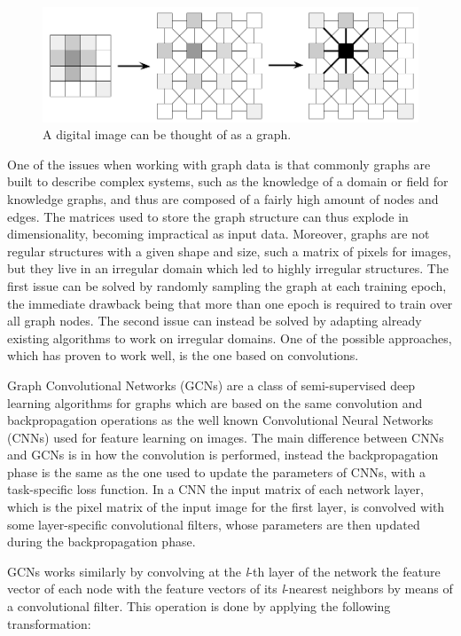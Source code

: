 \documentclass[%
    corpo=13.5pt,
    twoside,
    oldstyle,
    tipotesi=magistrale,
    greek,
    evenboxes
]{toptesi}
\begin{document}
\begin{figure}[h]
    \centering
    \includegraphics[scale=0.4]{img/pixels-as-graph.png}
    \caption{A digital image can be thought of as a graph.}
    \label{fig:pixels-as-graph}
\end{figure}

One of the issues when working with graph data is that commonly graphs
are built to describe complex systems, such as the knowledge of a
domain or field for knowledge graphs, and thus are composed of
a fairly high amount of nodes and edges. The matrices used to
store the graph structure can thus explode in dimensionality, becoming
impractical as input data. Moreover, graphs are not
regular structures with a given shape and size, such a matrix of pixels
for images, but they live in an irregular domain which led to highly
irregular structures.
The first issue can be solved by randomly sampling the graph at each
training epoch, the immediate drawback being that more than one epoch
is required to train over all graph nodes. The second issue can instead be
solved by adapting already existing algorithms to work on irregular domains.
One of the possible approaches, which has proven to work well, is
the one based on convolutions.

Graph Convolutional Networks (GCNs) \cite{kipf2016} are a class of
semi-supervised deep learning algorithms for graphs which are based on the
same convolution and backpropagation operations as the well known
Convolutional Neural Networks\cite{krizhevsky2012} (CNNs) used for feature
learning on images.
The main difference between CNNs and GCNs is in how the convolution is
performed, instead the backpropagation phase is the same as the one
used to update the parameters of CNNs, with a task-specific loss function.
In a CNN the input matrix of each network layer, which is the pixel matrix
of the input image for the first layer, is convolved with some layer-specific
convolutional filters, whose parameters are then updated during the
backpropagation phase.

GCNs works similarly by convolving at the \emph{l}-th layer
of the network the feature vector of each node with the feature
vectors of its \emph{l}-nearest neighbors by means of a convolutional filter.
This operation is done by applying the following transformation:
\end{document}
